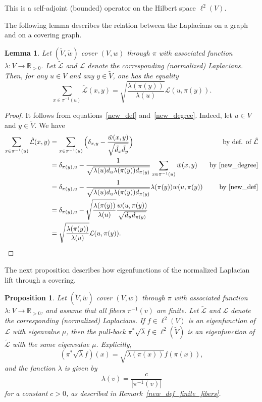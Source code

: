 \documentclass[11pt]{amsart}
\newcommand{\R}{\mathbb{R}}
\theoremstyle{definition}
\theoremstyle{remark}
\theoremstyle{plain}
\newtheorem{proposition}{Proposition}
\newtheorem{lemma}{Lemma}
\numberwithin{equation}{section}
\numberwithin{lemma}{section}
\numberwithin{definition}{section}
\numberwithin{proposition}{section}
\numberwithin{corollary}{section}
\numberwithin{theorem}{section}
\numberwithin{remark}{section}
\begin{document}
This is a self-adjoint (bounded) operator on the Hilbert space $\ell^2(V)$.

The following lemma describes the relation between the Laplacians on a graph and on a covering graph.
\begin{lemma}\label{norm_lap_cov}
 Let $(\tilde{V},\tilde{w})$ cover $(V,w)$ through $\pi$ with associated function $\lambda: V \to \R_{>0}$. Let $\tilde{\mathcal{L}}$ and $\mathcal{L}$ denote the corresponding (normalized) Laplacians.
 Then, for any $u\in V$ and any $y\in \tilde{V}$, one has the equality
 \begin{equation}\label{norm_lap_cov_rel}
\sum_{x\in\pi^{-1}(u)}\tilde{\mathcal{L}}(x,y)=\sqrt{\frac{\lambda(\pi(y))}{\lambda(u)}} \mathcal{L} (u,\pi(y)).
\end{equation}
\end{lemma}

\begin{proof}
It follows from equations~\eqref{new_def} and~\eqref{new_degree}.
Indeed, let $u\in V$ and $y\in \tilde{V}$. We have
\begin{align*}
 \sum_{x\in\pi^{-1}(u)} \tilde{\mathcal{L}}(x,y) & = \sum_{x\in\pi^{-1}(u)} \Big( \delta_{x,y} - \frac{\tilde w(x,y)}{\sqrt{\tilde d_x\tilde d_y}} \Big) & \text{by def. of $\tilde{\mathcal{L}}$}\\
 & = \delta_{\pi(y),u} - \frac{1}{\sqrt{\lambda(u)d_u\lambda(\pi(y))d_{\pi(y)}}}\sum_{x\in\pi^{-1}(u)}\tilde w(x,y) & \text{by \eqref{new_degree}}\\
 & = \delta_{\pi(y),u} - \frac{1}{\sqrt{\lambda(u)d_u\lambda(\pi(y))d_{\pi(y)}}}\lambda(\pi(y))w(u,\pi(y)) & \text{by \eqref{new_def}}\\
 & = \delta_{\pi(y),u} - \sqrt{\frac{\lambda(\pi(y))}{\lambda(u)}}\frac{w(u,\pi(y))}{\sqrt{d_ud_{\pi(y)}}} \\
 & = \sqrt{\frac{\lambda(\pi(y))}{\lambda(u)}}\mathcal{L}(u,\pi(y)).
\end{align*}
\end{proof}

The next proposition describes how eigenfunctions of the normalized Laplacian lift through a covering.
\begin{proposition}\label{efct_cov}
 Let $(\tilde{V},\tilde{w})$ cover $(V,w)$ through $\pi$ with associated function $\lambda: V \to \R_{>0}$, and assume that all fibers $\pi^{-1}(v)$ are finite. Let $\tilde{\mathcal{L}}$ and $\mathcal{L}$ denote the corresponding (normalized) Laplacians. If $f\in \ell^2(V)$ is an eigenfunction of $\mathcal{L}$ with  eigenvalue $\mu$, then the pull-back $\pi^{*}\sqrt{\lambda}f \in \ell^2(\tilde{V})$ is an eigenfunction of $\tilde{\mathcal{L}}$ with the same eigenvalue $\mu$. Explicitly, 
 $$
 (\pi^{*}\sqrt{\lambda}f)(x)=\sqrt{\lambda(\pi(x))}f(\pi(x)),
 $$
 and 
 the function $\lambda$ is given by
$$
\lambda(v)=\frac{c}{|\pi^{-1}(v)|}
$$
 for a constant $c>0$, as described in Remark~\ref{new_def_finite_fibers}.
\end{proposition}
\end{document}
